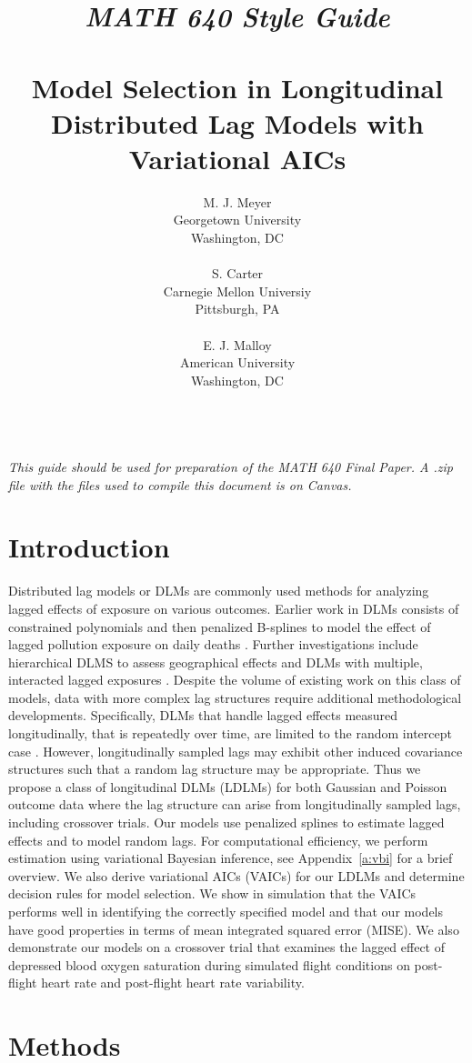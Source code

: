 \documentclass[10pt]{article}
\title{\emph{MATH 640 Style Guide}\\ \ \\  Model Selection in Longitudinal Distributed Lag Models with Variational AICs}
\author{
  M. J. Meyer \\
  Georgetown University \\
  Washington, DC \\
\\\And
 S. Carter \\
  Carnegie Mellon Universiy \\
  Pittsburgh, PA \\
\\\And
  E. J. Malloy \\
  American University  \\
  Washington, DC \\
\\}
\begin{document}
\maketitle

\emph{This guide should be used for preparation of the MATH 640 Final Paper. A .zip file with the files used to compile this document is on Canvas.}

\section{Introduction}

Distributed lag models or DLMs are commonly used methods for analyzing lagged effects of exposure on various outcomes. Earlier work in DLMs consists of constrained polynomials and then penalized B-splines to model the effect of lagged pollution exposure on daily deaths \cite{Schwartz2000,Welty2009}. Further investigations include hierarchical DLMS to assess geographical effects \cite{Baek2016} and DLMs with multiple, interacted lagged exposures \cite{Wilson2017}. Despite the volume of existing work on this class of models, data with more complex lag structures require additional methodological developments. Specifically, DLMs that handle lagged effects measured longitudinally, that is repeatedly over time, are limited to the random intercept case \cite{Baek2016}. However, longitudinally sampled lags may exhibit other induced covariance structures such that a random lag structure may be appropriate. Thus we propose a class of longitudinal DLMs (LDLMs) for both Gaussian and Poisson outcome data where the lag structure can arise from longitudinally sampled lags, including crossover trials. Our models use penalized splines to estimate lagged effects and to model random lags. For computational efficiency, we perform estimation using variational Bayesian inference, see Appendix~\ref{a:vbi} for a brief overview. We also derive variational AICs (VAICs) for our LDLMs and determine decision rules for model selection. We show in simulation that the VAICs performs well in identifying the correctly specified model and that our models have good properties in terms of mean integrated squared error (MISE). We also demonstrate our models on a crossover trial that examines the lagged effect of depressed blood oxygen saturation during simulated flight conditions on post-flight heart rate and post-flight heart rate variability. 

\section{Methods}
\end{document}
